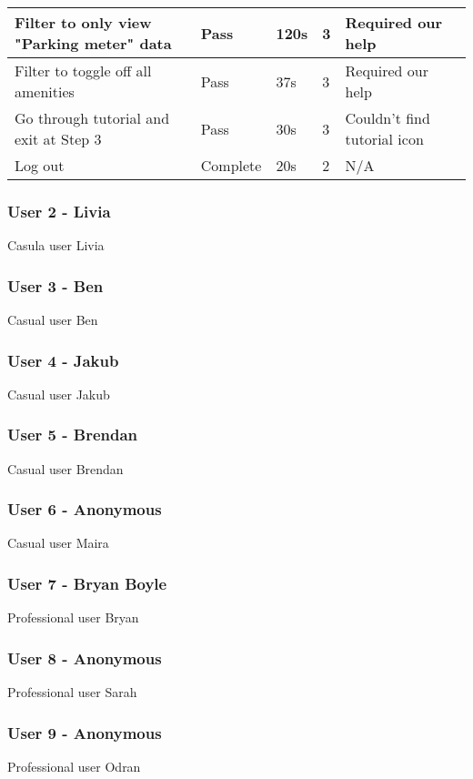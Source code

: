 \begin{table}[h!]
\begin{tabular}{|p{}|p{}|p{}|p{}|p{}|}
        \hline
        Filter to only view "Parking meter" data      & Pass                   & 120s                & 3                 & Required our help           \\
        \hline
        Filter to toggle off all amenities            & Pass                   & 37s                 & 3                 & Required our help           \\
        \hline
        Go through tutorial and exit at Step 3        & Pass                   & 30s                 & 3                 & Couldn't find tutorial icon \\
        \hline
        Log out                                       & Complete               & 20s                 & 2                 & N/A                         \\
        \hline
    \end{tabular}
\end{table}

\newpage
\subsubsection{User 2 - Livia}
Casula user Livia

\newpage
\subsubsection{User 3 - Ben}
Casual user Ben

\newpage
\subsubsection{User 4 - Jakub}
Casual user Jakub

\newpage
\subsubsection{User 5 - Brendan}
Casual user Brendan

\newpage
\subsubsection{User 6 - Anonymous}
Casual user Maira

\newpage
\subsubsection{User 7 - Bryan Boyle}
Professional user Bryan

\newpage
\subsubsection{User 8 - Anonymous}
Professional user Sarah

\newpage
\subsubsection{User 9 - Anonymous}
Professional user Odran
